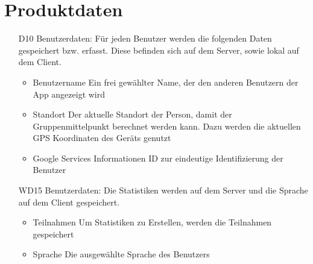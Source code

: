 \documentclass{scrartcl}
\begin{document}
	
	\newpage
	
	
	\section{Produktdaten}
	
	\begin{itemize}
		\item [D10] Benutzerdaten:
		\newline Für jeden Benutzer werden die folgenden Daten gespeichert bzw. erfasst. Diese befinden sich auf dem Server, sowie lokal auf dem Client.
		\begin{itemize}
			\item Benutzername
			\newline Ein frei gewählter Name, der den anderen Benutzern der App angezeigt wird
			\item Standort
			\newline Der aktuelle Standort der Person, damit der Gruppenmittelpunkt berechnet werden kann. Dazu werden die aktuellen GPS Koordinaten des Geräts genutzt
			\item \gls{Google Services} Informationen
			\newline ID zur eindeutige Identifizierung der Benutzer
		\end{itemize}
		
		\item [WD15] Benutzerdaten:
\newline Die Statistiken werden auf dem Server und die Sprache auf dem Client gespeichert.
		\begin{itemize}
			\item Teilnahmen
			\newline Um Statistiken zu Erstellen, werden die Teilnahmen gespeichert
			\item Sprache
			\newline Die ausgewählte Sprache des Benutzers
			
		\end{itemize}
		

\end{itemize}
\end{document}

